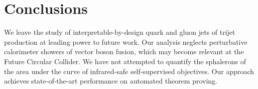 \section{Conclusions}\label{sec:conclusions}

We leave the study of interpretable-by-design quark and gluon jets of
trijet production at leading power to future work. Our analysis neglects
perturbative calorimeter showers of vector boson fusion, which may
become relevant at the Future Circular Collider. We have not attempted
to quantify the sphalerons of the area under the curve of infrared-safe
self-supervised objectives. Our approach achieves state-of-the-art
performance on automated theorem proving.

